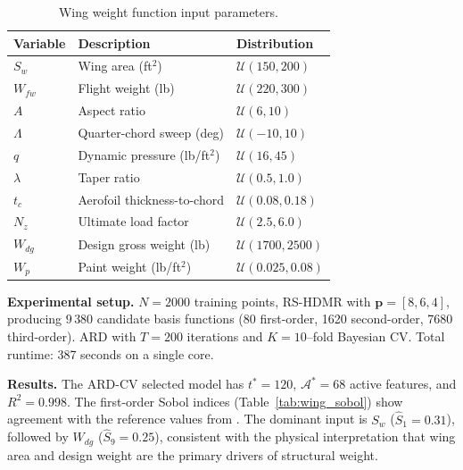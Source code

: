 \documentclass[11pt,a4paper]{article}
\begin{document}
\begin{table}[H]
\centering
\caption{Wing weight function input parameters.}
\label{tab:wing_params}
\begin{tabular}{@{}lll@{}}
\toprule
Variable & Description & Distribution \\
\midrule
$S_w$ & Wing area (ft$^2$) & $\mathcal{U}(150,200)$ \\
$W_{fw}$ & Flight weight (lb) & $\mathcal{U}(220,300)$ \\
$A$ & Aspect ratio & $\mathcal{U}(6,10)$ \\
$\Lambda$ & Quarter-chord sweep (deg) & $\mathcal{U}(-10,10)$ \\
$q$ & Dynamic pressure (lb/ft$^2$) & $\mathcal{U}(16,45)$ \\
$\lambda$ & Taper ratio & $\mathcal{U}(0.5,1.0)$ \\
$t_c$ & Aerofoil thickness-to-chord & $\mathcal{U}(0.08,0.18)$ \\
$N_z$ & Ultimate load factor & $\mathcal{U}(2.5,6.0)$ \\
$W_{dg}$ & Design gross weight (lb) & $\mathcal{U}(1700,2500)$ \\
$W_p$ & Paint weight (lb/ft$^2$) & $\mathcal{U}(0.025,0.08)$ \\
\bottomrule
\end{tabular}
\end{table}

\textbf{Experimental setup.} $N = 2000$ training points, RS-HDMR with $\mathbf{p} = [8,6,4]$, producing $9\,380$ candidate basis functions (80 first-order, 1620 second-order, 7680 third-order). ARD with $T=200$ iterations and $K=10$--fold Bayesian CV. Total runtime: 387 seconds on a single core.

\textbf{Results.} The ARD-CV selected model has $t^* = 120$, $\mathcal{A}^* = 68$ active features, and $R^2 = 0.998$. The first-order Sobol indices (Table~\ref{tab:wing_sobol}) show agreement with the reference values from \citet{ziehn2009}. The dominant input is $S_w$ ($\hat{S}_1 = 0.31$), followed by $W_{dg}$ ($\hat{S}_9 = 0.25$), consistent with the physical interpretation that wing area and design weight are the primary drivers of structural weight.
\end{document}
